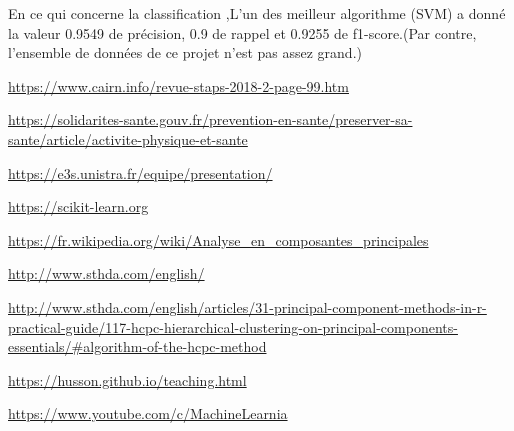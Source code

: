 \documentclass[12pt]{article}
\begin{document}
En ce qui concerne la classification ,L'un des meilleur algorithme (SVM) a donné la valeur 0.9549 de précision, 0.9 de rappel et 0.9255 de f1-score.(Par contre, l'ensemble de données de ce projet n'est pas assez grand.)

\begin{thebibliography}{9}

\url{https://www.cairn.info/revue-staps-2018-2-page-99.htm}


\url{https://solidarites-sante.gouv.fr/prevention-en-sante/preserver-sa-sante/article/activite-physique-et-sante}

\url{https://e3s.unistra.fr/equipe/presentation/}

\url{https://scikit-learn.org}

\bibitem{}
\url{https://fr.wikipedia.org/wiki/Analyse_en_composantes_principales}


\url{http://www.sthda.com/english/}

\url{http://www.sthda.com/english/articles/31-principal-component-methods-in-r-practical-guide/117-hcpc-hierarchical-clustering-on-principal-components-essentials/#algorithm-of-the-hcpc-method}


\url{https://husson.github.io/teaching.html}


\url{https://www.youtube.com/c/MachineLearnia}

\url{}

\end{thebibliography}
\end{document}
